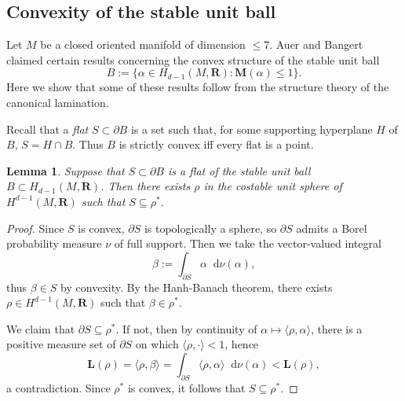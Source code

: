 \documentclass[reqno,11pt]{amsart}
\newcommand{\RR}{\mathbf{R}}
\newcommand*\dif{\mathop{}\!\mathrm{d}}
\newcommand{\Mass}{\mathbf M}
\newcommand{\Comass}{\mathbf L}
\newcommand{\dfn}[1]{\emph{#1}\index{#1}}
\newtheorem{lemma}[theorem]{Lemma}
\theoremstyle{definition}
\numberwithin{equation}{section}
\begin{document}
\subsection{Convexity of the stable unit ball}\label{convexity sec}
Let $M$ be a closed oriented manifold of dimension $\leq 7$.
Auer and Bangert \cite{Auer01} claimed certain results concerning the convex structure of the stable unit ball
$$B := \{\alpha \in H_{d - 1}(M, \RR): \Mass(\alpha) \leq 1\}.$$
Here we show that some of these results follow from the structure theory of the canonical lamination.

Recall that a \dfn{flat} $S \subset \partial B$ is a set such that, for some supporting hyperplane $H$ of $B$, $S = H \cap B$.
Thus $B$ is strictly convex iff every flat is a point.

\begin{lemma}
Suppose that $S \subset \partial B$ is a flat of the stable unit ball $B \subset H_{d - 1}(M, \RR)$.
Then there exists $\rho$ in the costable unit sphere of $H^{d - 1}(M, \RR)$ such that $S \subseteq \rho^*$.
\end{lemma}
\begin{proof}
Since $S$ is convex, $\partial S$ is topologically a sphere, so $\partial S$ admits a Borel probability measure $\nu$ of full support.
Then we take the vector-valued integral 
$$\beta := \int_{\partial S} \alpha \dif \nu(\alpha),$$
thus $\beta \in S$ by convexity.
By the Hanh-Banach theorem, there exists $\rho \in H^{d - 1}(M, \RR)$ such that $\beta \in \rho^*$.

We claim that $\partial S \subseteq \rho^*$.
If not, then by continuity of $\alpha \mapsto \langle \rho, \alpha\rangle$, there is a positive measure set of $\partial S$ on which $\langle \rho, \cdot\rangle < 1$, hence
$$\Comass(\rho) = \langle \rho, \beta\rangle = \int_{\partial S} \langle \rho, \alpha\rangle \dif \nu(\alpha) < \Comass(\rho),$$
a contradiction.
Since $\rho^*$ is convex, it follows that $S \subseteq \rho^*$.
\end{proof}
\end{document}
